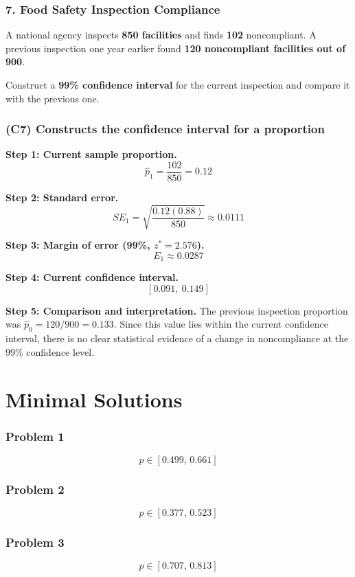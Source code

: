 	\section*{7. Food Safety Inspection Compliance}
	
	A national agency inspects \textbf{850 facilities} and finds \textbf{102} noncompliant. A previous inspection one year earlier found \textbf{120 noncompliant facilities out of 900}.
	
	Construct a \textbf{99\% confidence interval} for the current inspection and compare it with the previous one.
	
	\section{(C7) Constructs the confidence interval for a proportion}
	
	\textbf{Step 1: Current sample proportion.}
	\[
	\hat{p}_1 = \frac{102}{850} = 0.12
	\]
	
	\textbf{Step 2: Standard error.}
	\[
	SE_1 = \sqrt{\frac{0.12(0.88)}{850}} \approx 0.0111
	\]
	
	\textbf{Step 3: Margin of error (99\%, \(z^* = 2.576\)).}
	\[
	E_1 \approx 0.0287
	\]
	
	\textbf{Step 4: Current confidence interval.}
	\[
	[0.091,\ 0.149]
	\]
	
	\textbf{Step 5: Comparison and interpretation.}
	The previous inspection proportion was \(\hat{p}_0 = 120/900 = 0.133\). Since this value lies within the current confidence interval, there is no clear statistical evidence of a change in noncompliance at the 99\% confidence level.
	

\part{Minimal Solutions}
\section*{Problem 1}
\[
p \in [0.499,\,0.661]
\]

\section*{Problem 2}
\[
p \in [0.377,\,0.523]
\]

\section*{Problem 3}
\[
p \in [0.707,\,0.813]
\]


